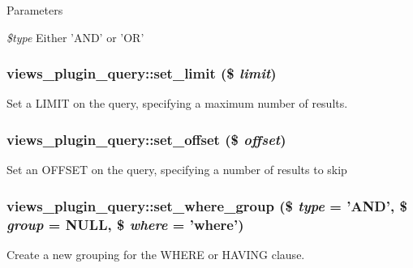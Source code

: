 \begin{DoxyParams}{Parameters}
\item[{\em \$type}]Either 'AND' or 'OR' \end{DoxyParams}
\hypertarget{classviews__plugin__query_af0ecebf1eeb808ff9d2c78d8e63fc302}{
\subsubsection[{set\_\-limit}]{\setlength{\rightskip}{0pt plus 5cm}views\_\-plugin\_\-query::set\_\-limit (\$ {\em limit})}}
\label{classviews__plugin__query_af0ecebf1eeb808ff9d2c78d8e63fc302}
Set a LIMIT on the query, specifying a maximum number of results. \hypertarget{classviews__plugin__query_acdea49538238dddde6704ba43c358e4f}{
\subsubsection[{set\_\-offset}]{\setlength{\rightskip}{0pt plus 5cm}views\_\-plugin\_\-query::set\_\-offset (\$ {\em offset})}}
\label{classviews__plugin__query_acdea49538238dddde6704ba43c358e4f}
Set an OFFSET on the query, specifying a number of results to skip \hypertarget{classviews__plugin__query_af7b4464ab8bd401d45c9eaa53f94a26c}{
\subsubsection[{set\_\-where\_\-group}]{\setlength{\rightskip}{0pt plus 5cm}views\_\-plugin\_\-query::set\_\-where\_\-group (\$ {\em type} = {\ttfamily 'AND'}, \/  \$ {\em group} = {\ttfamily NULL}, \/  \$ {\em where} = {\ttfamily 'where'})}}
\label{classviews__plugin__query_af7b4464ab8bd401d45c9eaa53f94a26c}
Create a new grouping for the WHERE or HAVING clause.


